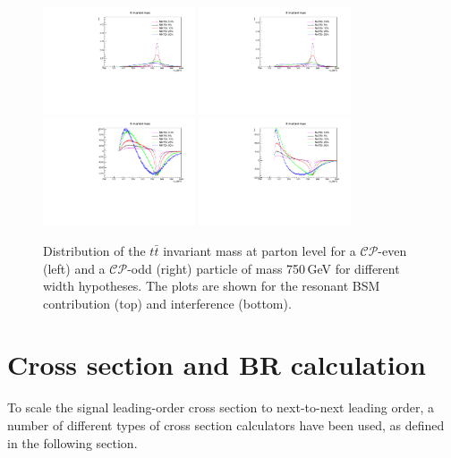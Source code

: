 \begin{figure} \centering
  \includegraphics[width=0.4\textwidth]{fig/chapt4/gen_plots/H_res_ljets_M750.pdf}
  \includegraphics[width=0.4\textwidth]{fig/chapt4/gen_plots/A_res_ljets_M750.pdf}\\
  \includegraphics[width=0.4\textwidth]{fig/chapt4/gen_plots/H_int_ljets_M750.pdf}
  \includegraphics[width=0.4\textwidth]{fig/chapt4/gen_plots/A_int_ljets_M750.pdf}\\
  \caption{Distribution of the $t\bar t$ invariant mass at parton level for a $\mathcal{CP}$-even (left) and a $\mathcal{CP}$-odd (right) particle of mass 750\,GeV for different width hypotheses. The plots are shown for the resonant BSM contribution (top) and interference (bottom).}
  \label{fig:mtt_gen_750}
\end{figure}

\section{Cross section and BR calculation}
To scale the signal leading-order cross section to next-to-next leading order, a number of different types of cross section calculators have been used, as defined in the following section.
